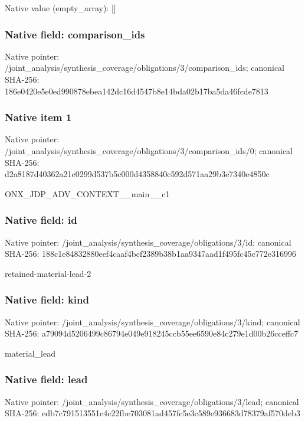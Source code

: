 \documentclass[10pt,a4paper]{article}
\begin{document}
Native value (empty\_\allowbreak{}array): []

\subsubsection{Native field: comparison\_\allowbreak{}ids}
Native pointer: /joint\_\allowbreak{}analysis/synthesis\_\allowbreak{}coverage/obligations/3/comparison\_\allowbreak{}ids; canonical SHA-256: 186e0420e5e0ed990878ebea142dc16d4547b8e14bda02b17ba5da46fcde7813

\subsubsection{Native item 1}
Native pointer: /joint\_\allowbreak{}analysis/synthesis\_\allowbreak{}coverage/obligations/3/comparison\_\allowbreak{}ids/0; canonical SHA-256: d2a8187d40362a21c0299d537b5c000d4358840c592d571aa29b3e7340e4850c

\begingroup\raggedright\sloppy ONX\_\allowbreak{}JDP\_\allowbreak{}ADV\_\allowbreak{}CONTEXT\_\allowbreak{}\_\allowbreak{}main\_\allowbreak{}\_\allowbreak{}c1\par\endgroup

\subsubsection{Native field: id}
Native pointer: /joint\_\allowbreak{}analysis/synthesis\_\allowbreak{}coverage/obligations/3/id; canonical SHA-256: 188c1e84832880eef4caaf4bcf2389b38b1aa9347aad1f495fc45c772e316996

\begingroup\raggedright\sloppy retained-material-lead-2\par\endgroup

\subsubsection{Native field: kind}
Native pointer: /joint\_\allowbreak{}analysis/synthesis\_\allowbreak{}coverage/obligations/3/kind; canonical SHA-256: a79094d5206499c86794e049e918245ccb55ee6590e84c279e1d00b26cceffc7

\begingroup\raggedright\sloppy material\_\allowbreak{}lead\par\endgroup

\subsubsection{Native field: lead}
Native pointer: /joint\_\allowbreak{}analysis/synthesis\_\allowbreak{}coverage/obligations/3/lead; canonical SHA-256: edb7c791513551c4c22fbe703081ad457fc5e3c589e936683d78379af570deb3
\end{document}
